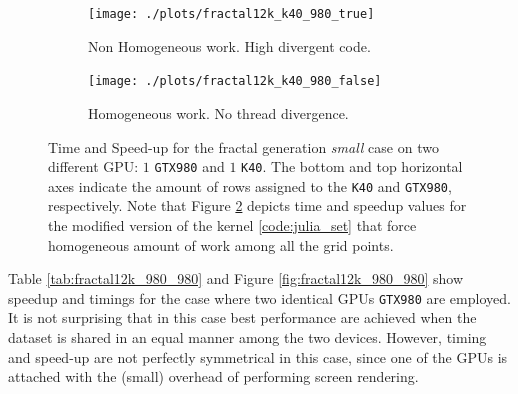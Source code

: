  \begin{figure}
     
     \begin{subfigure}{1.0\textwidth}
         \caption{Non Homogeneous work. High divergent code.}
         \texttt{[image: ./plots/fractal12k\_k40\_980\_true]}
         \label{fig:julia_two_GPU_true}
         
     \end{subfigure}        
     \endminipage\hfill
     \vspace{5mm}
     \begin{subfigure}{1.0\textwidth}
             \caption{Homogeneous work. No thread divergence.}
         \texttt{[image: ./plots/fractal12k\_k40\_980\_false]}
         \label{fig:julia_two_GPU_false}
     
     \end{subfigure}
     \endminipage\hfill
    
     \caption[Time and speed-up for the fractal generation fractal generation \textit{small} case on two different GPU: $1$ \texttt{GTX980} and $1$ \texttt{K40}.]{Time and Speed-up for the fractal generation \textit{small} case on two different GPU: $1$ \texttt{GTX980} and $1$ \texttt{K40}. The bottom and top horizontal axes indicate the amount of rows assigned to the \texttt{K40} and \texttt{GTX980}, respectively. Note that Figure \ref{fig:julia_two_GPU_false} depicts time and speedup values for the modified version of the kernel \ref{code:julia_set} that force homogeneous amount of work among all the grid points.}
     \label{fig:julia_two_GPU}
 \end{figure}

Table \ref{tab:fractal12k_980_980} and Figure \ref{fig:fractal12k_980_980} show speedup and timings for the case where two identical GPUs \texttt{GTX980} are employed. 
It is not surprising that in this case best performance are achieved when the dataset is shared in an equal manner among the two devices. However, timing and speed-up are not perfectly symmetrical in this case, since one of the GPUs is attached with the (small) overhead of performing screen rendering.

